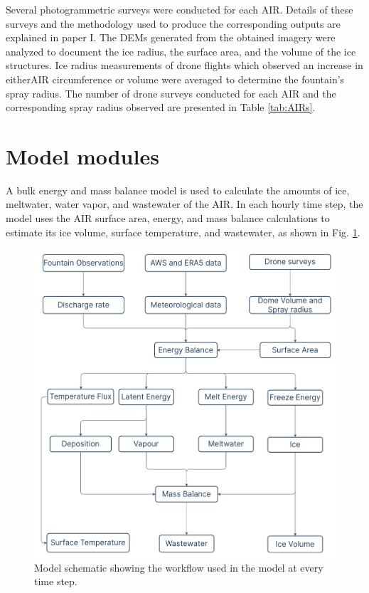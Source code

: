 Several photogrammetric surveys were conducted for each \ac{AIR}. Details of these surveys and the
methodology used to produce the corresponding outputs are explained in paper I. The
\ac{DEMs} generated from the obtained imagery were analyzed to document the ice radius, the surface area, and the
volume of the ice structures. Ice radius measurements of drone flights which observed an increase in either\ac{AIR}
circumference or volume were averaged to determine the fountain's spray radius. The number of drone surveys
conducted for each \Ac{AIR} and the corresponding spray radius observed are presented in Table \ref{tab:AIRs}.

\section{Model modules}
\label{sec:modules}

A bulk energy and mass balance model is used to calculate the amounts of ice, meltwater, water vapor, and
wastewater of the \ac{AIR}. In each hourly time step, the model uses the \ac{AIR} surface area, energy, and mass balance
calculations to estimate its ice volume, surface temperature, and wastewater, as shown in Fig. \ref{fig:schema}.

\begin{figure}
	\begin{center}
		\includegraphics[width=10 cm]{figs/model_schematic.jpg}
	\end{center}
	\caption{Model schematic showing the workflow used in the model at every time step. }
	\label{fig:schema}
\end{figure}

